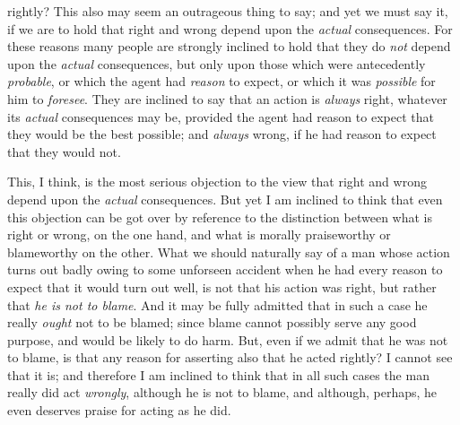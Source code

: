 rightly? This also  may seem an outrageous thing to say; and
yet we must say it, if we are to hold that right and wrong depend upon
the \textit{actual} consequences. For these reasons many people are
strongly inclined to hold that they do \textit{not} depend upon the
\textit{actual} consequences, but only upon those which were
antecedently \textit{probable}, or which the agent had \textit{reason}
to expect, or which it was \textit{possible} for him to
\textit{foresee}. They are inclined to say that an action is
\textit{always} right, whatever its \textit{actual} consequences may
be, provided the agent had reason to expect that they would be the
best possible; and \textit{always} wrong, if he had reason to expect
that they would not.

This, I think, is the most serious objection to the view that right
and wrong depend upon the \textit{actual} consequences. But yet I am
inclined to think that even this objection can be got over by
reference to the distinction between what is right or wrong, on the
one hand, and what is morally praiseworthy or blameworthy on the
other. What we should naturally say of a man whose action turns out
badly owing to some unforseen accident when he had every reason to
expect that it  would turn out well, is not that his action
was right, but rather that \textit{he is not to blame}. And it may be
fully admitted that in such a case he really \textit{ought} not to be
blamed; since blame cannot possibly serve any good purpose, and would
be likely to do harm. But, even if we admit that he was not to blame,
is that any reason for asserting also that he acted rightly? I cannot
see that it is; and therefore I am inclined to think that in all such
cases the man really did act \textit{wrongly}, although he is not to
blame, and although, perhaps, he even deserves praise for acting as he
did.

